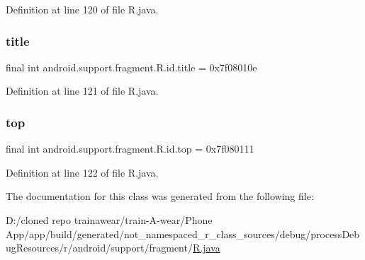 Definition at line 120 of file R.\+java.

\mbox{\label{classandroid_1_1support_1_1fragment_1_1_r_1_1id_a796ac9208dc3433c3ab2d7a45f9f35fb}} 
\subsubsection{\texorpdfstring{title}{title}}
{\footnotesize\ttfamily final int android.\+support.\+fragment.\+R.\+id.\+title = 0x7f08010e\hspace{0.3cm}{\ttfamily [static]}}



Definition at line 121 of file R.\+java.

\mbox{\label{classandroid_1_1support_1_1fragment_1_1_r_1_1id_a610fdd324f3b197216391211c720d444}} 
\subsubsection{\texorpdfstring{top}{top}}
{\footnotesize\ttfamily final int android.\+support.\+fragment.\+R.\+id.\+top = 0x7f080111\hspace{0.3cm}{\ttfamily [static]}}



Definition at line 122 of file R.\+java.



The documentation for this class was generated from the following file\+:\begin{DoxyCompactItemize}
\item 
D\+:/cloned repo trainawear/train-\/\+A-\/wear/\+Phone App/app/build/generated/not\+\_\+namespaced\+\_\+r\+\_\+class\+\_\+sources/debug/process\+Debug\+Resources/r/android/support/fragment/\mbox{\hyperlink{process_debug_resources_2r_2android_2support_2fragment_2_r_8java}{R.\+java}}\end{DoxyCompactItemize}
